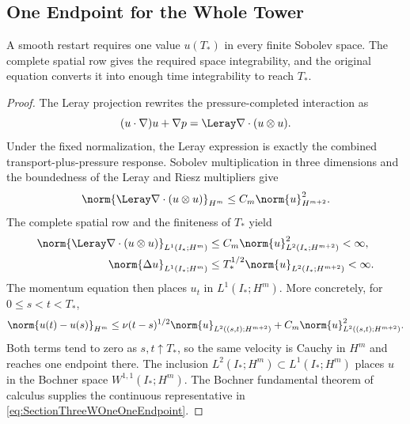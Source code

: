 \subsection{One Endpoint for the Whole Tower}\label{sub:OneEndpointForTheWholeTower}

A smooth restart requires one value \(u(T_*)\) in every finite Sobolev space.
The complete spatial row gives the required space integrability, and the original equation converts it into enough time integrability to reach \(T_*\).


\begin{proof}
The Leray projection rewrites the pressure-completed interaction as
\[
  (u\cdot\nabla)u+\nabla p
  =\Leray\nabla\cdot(u\otimes u).
\]
Under the fixed normalization, the Leray expression is exactly the combined transport-plus-pressure response.
Sobolev multiplication in three dimensions and the boundedness of the Leray and Riesz multipliers give
\[
  \norm{\Leray\nabla\cdot(u\otimes u)}_{H^m}
  \leq
  C_m\norm{u}_{H^{m+2}}^2.
\]
The complete spatial row and the finiteness of \(T_*\) yield
\begin{align*}
  \norm{\Leray\nabla\cdot(u\otimes u)}_{L^1(I_*;H^m)}
  &\leq
  C_m\norm{u}_{L^2(I_*;H^{m+2})}^{2}
  <\infty,\\
  \norm{\Delta u}_{L^1(I_*;H^m)}
  &\leq
  T_*^{1/2}\norm{u}_{L^2(I_*;H^{m+2})}
  <\infty.
\end{align*}
The momentum equation then places \(u_t\) in \(L^1(I_*;H^m)\).
More concretely, for \(0\leq s<t<T_*\),
\[
  \norm{u(t)-u(s)}_{H^m}
  \leq
  \nu(t-s)^{1/2}\norm{u}_{L^2((s,t);H^{m+2})}
  +C_m\norm{u}_{L^2((s,t);H^{m+2})}^{2}.
\]
Both terms tend to zero as \(s,t\uparrow T_*\), so the same velocity is Cauchy in \(H^m\) and reaches one endpoint there.
The inclusion \(L^2(I_*;H^m)\subset L^1(I_*;H^m)\) places \(u\) in the Bochner space \(W^{1,1}(I_*;H^m)\).
The Bochner fundamental theorem of calculus supplies the continuous representative in \eqref{eq:SectionThreeWOneOneEndpoint}.
\end{proof}

